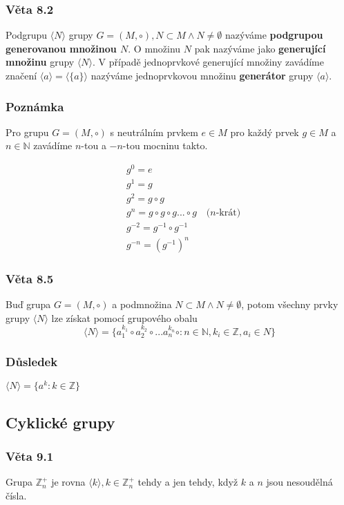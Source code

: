 \documentclass[12pt, letterpaper]{article}
\begin{document}
\subsubsection*{Věta 8.2}
Podgrupu $\langle N \rangle$ grupy $G = (M, \circ), N \subset M \wedge N \neq \emptyset$
nazýváme \textbf{podgrupou generovanou množinou $N$}.
O množinu $N$ pak nazýváme jako \textbf{generující množinu} grupy $\langle N \rangle$.
V případě jednoprvkové generující množiny zavádíme značení $\langle a \rangle = \langle \{ a \} \rangle$
nazýváme jednoprvkovou množinu \textbf{generátor} grupy $\langle a \rangle$.

\subsubsection*{Poznámka}
Pro grupu $G = (M, \circ)$ s neutrálním prvkem $e \in M$
pro každý prvek $g \in M$ a $n \in \mathbb{N}$ zavádíme $n$-tou a $-n$-tou mocninu takto.

\begin{align*}
    &g^0 = e \\
    &g^1 = g \\
    &g^2 = g \circ g \\
    &g^n = g \circ g \circ g ... \circ g \quad \textrm{($n$-krát)} \\
    &g^{-2} = g^{-1} \circ g^{-1} \\
    &g^{-n} = (g^{-1})^{n}
\end{align*}

\subsubsection*{Věta 8.5}
Buď grupa $G = (M, \circ)$ a podmnožina $N \subset M \wedge N \neq \emptyset$,
potom všechny prvky grupy $\langle N \rangle$ lze získat pomocí grupového obalu
\[\langle N \rangle = \{a_{1}^{k_1} \circ a_{2}^{k_2} \circ ... a_{n}^{k_n} \circ: n \in \mathbb{N}, k_i \in \mathbb{Z}, a_i \in N\} \]

\subsubsection*{Důsledek}
$ \langle N \rangle = \{a^k: k \in \mathbb{Z}\}$

\subsection{Cyklické grupy}

\subsubsection*{Věta 9.1}
Grupa $\mathbb{Z}^+_n$ je rovna $\langle k \rangle, k \in \mathbb{Z}^+_n$
tehdy a jen tehdy, když $k$ a $n$ jsou nesoudělná čísla.
\end{document}
